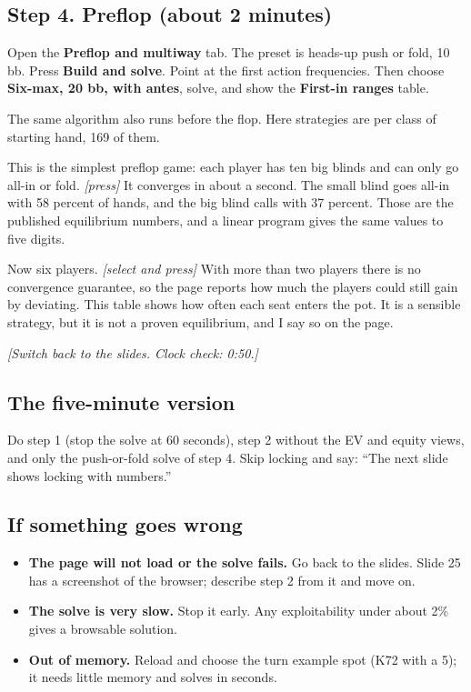 \documentclass[11pt]{article}
\newcommand{\cue}[1]{{\small\itshape\color{black!65}[#1]}}
\begin{document}
\subsection*{Step 4. Preflop (about 2 minutes)}
\begin{act}
Open the \textbf{Preflop and multiway} tab. The preset is heads-up push or fold, 10 bb. Press \textbf{Build and
solve}. Point at the first action frequencies. Then choose \textbf{Six-max, 20 bb, with antes}, solve, and show the
\textbf{First-in ranges} table.
\end{act}
\begin{say}
The same algorithm also runs before the flop. Here strategies are per class of starting hand, 169 of them.

This is the simplest preflop game: each player has ten big blinds and can only go all-in or fold. \cue{press} It
converges in about a second. The small blind goes all-in with 58 percent of hands, and the big blind calls with 37
percent. Those are the published equilibrium numbers, and a linear program gives the same values to five digits.

Now six players. \cue{select and press} With more than two players there is no convergence guarantee, so the page
reports how much the players could still gain by deviating. This table shows how often each seat enters the pot. It
is a sensible strategy, but it is not a proven equilibrium, and I say so on the page.
\end{say}
\cue{Switch back to the slides. Clock check: 0:50.}

\subsection*{The five-minute version}
Do step 1 (stop the solve at 60 seconds), step 2 without the EV and equity views, and only the push-or-fold solve of
step 4. Skip locking and say: ``The next slide shows locking with numbers.''

\subsection*{If something goes wrong}
\begin{itemize}[nosep]
\item \textbf{The page will not load or the solve fails.} Go back to the slides. Slide 25 has a screenshot of the
browser; describe step 2 from it and move on.
\item \textbf{The solve is very slow.} Stop it early. Any exploitability under about 2\% gives a browsable solution.
\item \textbf{Out of memory.} Reload and choose the turn example spot (K72 with a 5); it needs little memory and
solves in seconds.
\end{itemize}
\end{document}
